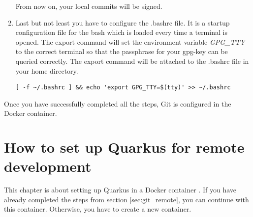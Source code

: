 \begin{enumerate}
        From now on, your local commits will be signed.   
        \item Last but not least you have to configure the .bashrc file. It is a startup configuration file for the \ac{bash} which is loaded every time a terminal is opened. The export command will set the environment variable \textit{GPG\_TTY} to the correct terminal so that the passphrase for your \ac{gpg}-key can be queried correctly. The export command will be attached  to the .bashrc file in your home directory.  
            \begin{lstlisting}[style=bash] 
[ -f ~/.bashrc ] && echo 'export GPG_TTY=$(tty)' >> ~/.bashrc
            \end{lstlisting}
    \end{enumerate}
    Once you have successfully completed all the steps, Git is configured in the Docker container.   


\section{How to set up Quarkus for remote development}\label{sec:quarkus_remote}
    This chapter is about setting up Quarkus in a Docker container \autocite[cf.][]{quarkus}. If you have already completed the steps from section \ref{sec:git_remote}, you can continue with this container. Otherwise, you have to create a new container.

